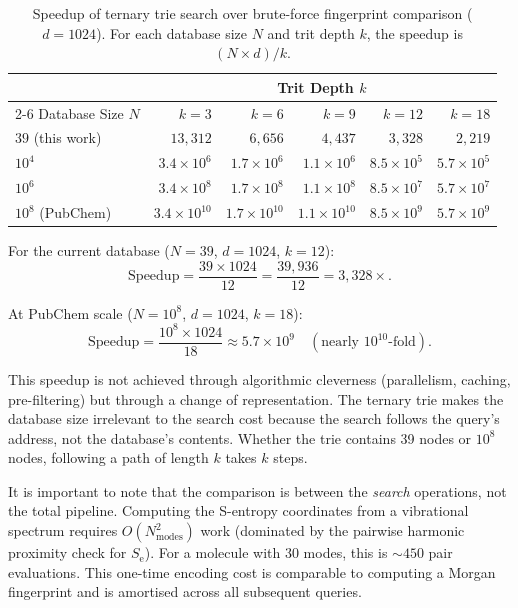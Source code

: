 \documentclass[11pt,a4paper]{article}
\theoremstyle{definition}
\theoremstyle{remark}
\newcommand{\Se}{S_{\mathrm{e}}}
\begin{document}
\begin{table}[H]
\centering
\caption{Speedup of ternary trie search over brute-force fingerprint comparison ($d = 1024$). For each database size $N$ and trit depth $k$, the speedup is $(N \times d) / k$.}
\label{tab:speedup}
\begin{tabular}{lrrrrr}
\toprule
& \multicolumn{5}{c}{Trit Depth $k$} \\
\cmidrule(lr){2-6}
Database Size $N$ & $k=3$ & $k=6$ & $k=9$ & $k=12$ & $k=18$ \\
\midrule
$39$ (this work)        & $13{,}312$ & $6{,}656$ & $4{,}437$ & $3{,}328$ & $2{,}219$ \\
$10^4$                  & $3.4 \times 10^6$ & $1.7 \times 10^6$ & $1.1 \times 10^6$ & $8.5 \times 10^5$ & $5.7 \times 10^5$ \\
$10^6$                  & $3.4 \times 10^8$ & $1.7 \times 10^8$ & $1.1 \times 10^8$ & $8.5 \times 10^7$ & $5.7 \times 10^7$ \\
$10^8$ (PubChem)        & $3.4 \times 10^{10}$ & $1.7 \times 10^{10}$ & $1.1 \times 10^{10}$ & $8.5 \times 10^9$ & $5.7 \times 10^9$ \\
\bottomrule
\end{tabular}
\end{table}

For the current database ($N = 39$, $d = 1024$, $k = 12$):
\begin{equation}
\text{Speedup} = \frac{39 \times 1024}{12} = \frac{39{,}936}{12} = 3{,}328\times.
\end{equation}

At PubChem scale ($N = 10^8$, $d = 1024$, $k = 18$):
\begin{equation}
\text{Speedup} = \frac{10^8 \times 1024}{18} \approx 5.7 \times 10^9 \quad (\text{nearly } 10^{10}\text{-fold}).
\end{equation}

This speedup is not achieved through algorithmic cleverness (parallelism, caching, pre-filtering) but through a change of representation. The ternary trie makes the database size irrelevant to the search cost because the search follows the query's address, not the database's contents. Whether the trie contains 39 nodes or $10^8$ nodes, following a path of length $k$ takes $k$ steps.

It is important to note that the comparison is between the \emph{search} operations, not the total pipeline. Computing the S-entropy coordinates from a vibrational spectrum requires $O(N_{\mathrm{modes}}^2)$ work (dominated by the pairwise harmonic proximity check for $\Se$). For a molecule with 30 modes, this is $\sim 450$ pair evaluations. This one-time encoding cost is comparable to computing a Morgan fingerprint and is amortised across all subsequent queries.
\end{document}
